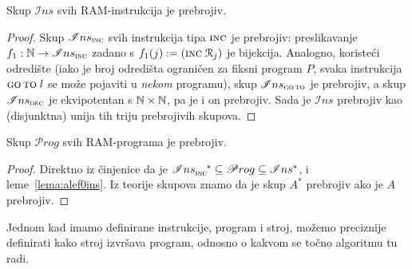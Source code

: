 \begin{lema}[{name=[prebrojivost skupa $\mathscr Ins$]}]\label{lema:alef0ins}
Skup $\mathscr Ins$ svih RAM-instrukcija je prebrojiv.
\end{lema}
\begin{proof}
Skup $\mathscr Ins_{\textsc{inc}}$ svih instrukcija tipa $\textsc{inc}$ je prebrojiv: preslikavanje $f_1:{\mathbb N}\to\mathscr Ins_{\textsc{inc}}$ zadano s $f_1(j):=(\textsc{inc}\;\mathcal R_{j})$ je bijekcija. Analogno, koristeći odredište (iako je broj odredišta ograničen za fiksni program $P$, svaka instrukcija $\textsc{go\,to}\;l$ se može pojaviti u \emph{nekom} programu), skup $\mathscr Ins_{\textsc{go\,to}}$ je prebrojiv, a skup $\mathscr Ins_{\textsc{dec}}$ je ek\-vi\-po\-ten\-tan s ${\mathbb N}\times{\mathbb N}$, pa je i on prebrojiv. Sada je $\mathscr Ins$ prebrojiv kao (disjunktna) unija tih triju prebrojivih skupova.
\end{proof}

\begin{korolar}[{name=[prebrojivost skupa $\mathscr Prog$]}]\label{kor:alef0prog}
Skup $\mathscr Prog$ svih RAM-programa je prebrojiv.
\end{korolar}
\begin{proof}
Direktno iz činjenice da je $\mathscr Ins_{\textsc{inc}}^{\quad*}\subseteq\mathscr Prog\subseteq\mathscr Ins^*$, i leme~\ref{lema:alef0ins}. Iz teorije skupova znamo da je skup $A^*$ prebrojiv ako je $A$ prebrojiv.
\end{proof}


Jednom kad imamo definirane instrukcije, program i stroj, možemo preciznije definirati kako stroj izvršava program, odnosno o kakvom se točno algoritmu tu radi.

